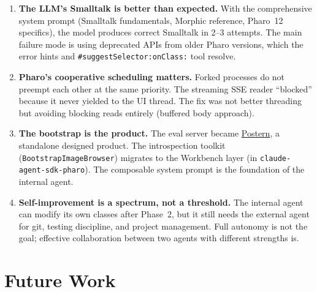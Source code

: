 \documentclass[a4paper,10pt,fleqn]{article}
\newcommand{\cls}[1]{\texttt{#1}}
\newcommand{\sel}[1]{\texttt{\##1}}
\begin{document}
\begin{enumerate}[label=\textbf{L\arabic*}.]
  \item \textbf{The LLM's Smalltalk is better than expected.}  With
    the comprehensive system prompt (Smalltalk fundamentals, Morphic
    reference, Pharo~12 specifics), the model produces correct Smalltalk
    in 2--3 attempts.  The main failure mode is using deprecated APIs
    from older Pharo versions, which the error hints and
    \sel{suggestSelector:onClass:} tool resolve.

  \item \textbf{Pharo's cooperative scheduling matters.}  Forked
    processes do not preempt each other at the same priority.  The
    streaming SSE reader ``blocked'' because it never yielded to the UI
    thread.  The fix was not better threading but avoiding blocking
    reads entirely (buffered body approach).

  \item \textbf{The bootstrap is the product.}  The eval server became
    \href{https://github.com/punt-labs/postern}{Postern}, a standalone
    designed product.  The introspection toolkit
    (\cls{BootstrapImageBrowser}) migrates to the Workbench layer (in
    \texttt{claude-agent-sdk-pharo}).  The composable system prompt is
    the foundation of the internal agent.

  \item \textbf{Self-improvement is a spectrum, not a threshold.}
    The internal agent can modify its own classes after Phase~2, but it
    still needs the external agent for git, testing discipline, and
    project management.  Full autonomy is not the goal; effective
    collaboration between two agents with different strengths is.
\end{enumerate}

\section{Future Work}
\end{document}
